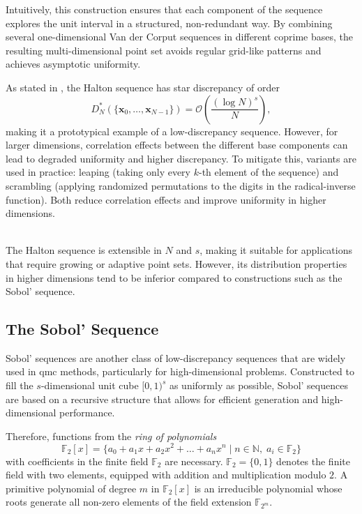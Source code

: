 Intuitively, this construction ensures that each component of the sequence
explores the unit interval in a structured, non-redundant way. By combining
several one-dimensional Van der Corput sequences in different coprime bases, the
resulting multi-dimensional point set avoids regular grid-like patterns and
achieves asymptotic uniformity.

As stated in \cite[Section 2.4]{leobacher2014introduction}, the Halton sequence
has star discrepancy of order
\begin{equation*}
    D_N^*(\{\boldsymbol{x}_0, \dots, \boldsymbol{x}_{N-1}\}) = \mathcal{O}\left( \frac{(\log N)^s}{N} \right),
\end{equation*}
making it a prototypical example of a low-discrepancy sequence. However, for
larger dimensions, correlation effects between the different base components can
lead to degraded uniformity and higher discrepancy. To mitigate this, variants
are used in practice: leaping (taking only every $k$-th element of the sequence)
and scrambling (applying randomized permutations to the digits in the
radical-inverse function). Both reduce correlation effects and improve
uniformity in higher dimensions.

\begin{remark} \ \\
The Halton sequence is extensible in $N$ and $s$, making it suitable for
applications that require growing or adaptive point sets. However, its
distribution properties in higher dimensions tend to be inferior compared to
constructions such as the Sobol' sequence.
\end{remark}


  \subsection{The Sobol' Sequence}

Sobol' sequences are another class of low-discrepancy sequences that are widely
used in \ac{qmc} methods, particularly for high-dimensional problems.
Constructed to fill the $s$-dimensional unit cube $[0,1)^s$ as uniformly as
possible, Sobol' sequences are based on a recursive structure that allows for
efficient generation and high-dimensional performance.

Therefore, functions from the \emph{ring of polynomials} 
\begin{equation*}
    \mathbb{F}_2[x] = \{
    a_0 + a_1 x + a_2 x^2 + \dots + a_n x^n \mid n \in \mathbb{N},\; a_i \in
    \mathbb{F}_2 \}
\end{equation*}
with coefficients in the finite field $\mathbb{F}_2$ are necessary.
$\mathbb{F}_2=\{0,1\}$ denotes the finite field with two elements, equipped with
addition and multiplication modulo $2$. A primitive polynomial of degree $m$ in
$\mathbb{F}_2[x]$ is an irreducible polynomial whose roots generate all non-zero
elements of the field extension $\mathbb{F}_{2^m}$.

